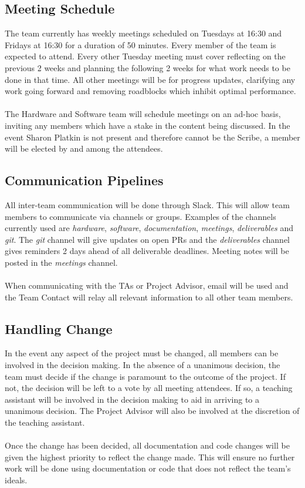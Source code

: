 \documentclass[11pt]{article}
\begin{document}
\subsection{Meeting Schedule}
The team currently has weekly meetings scheduled on Tuesdays at 16:30 and Fridays at 16:30 for a duration of 50 minutes. Every member of the team is expected to attend. Every other Tuesday meeting must cover reflecting on the previous 2 weeks and planning the following 2 weeks for what work needs to be done in that time. All other meetings will be for progress updates, clarifying any work going forward and removing roadblocks which inhibit optimal performance. \\ \\
The Hardware and Software team will schedule meetings on an ad-hoc basis, inviting any members which have a stake in the content being discussed. In the event Sharon Platkin is not present and therefore cannot be the Scribe, a member will be elected by and among the attendees.
\subsection{Communication Pipelines}
All inter-team communication will be done through Slack. This will allow team members to communicate via channels or groups. Examples of the channels currently used are \textit{hardware}, \textit{software}, \textit{documentation}, \textit{meetings}, \textit{deliverables} and \textit{git}. The \textit{git} channel will give updates on open PRs and the \textit{deliverables} channel gives reminders 2 days ahead of all deliverable deadlines. Meeting notes will be posted in the \textit{meetings} channel. \\ \\
When communicating with the TAs or Project Advisor, email will be used and the Team Contact will relay all relevant information to all other team members.
\subsection{Handling Change}
In the event any aspect of the project must be changed, all members can be involved in the decision making. In the absence of a unanimous decision, the team must decide if the change is paramount to the outcome of the project. If not, the decision will be left to a vote by all meeting attendees. If so, a teaching assistant will be involved in the decision making to aid in arriving to a unanimous decision. The Project Advisor will also be involved at the discretion of the teaching assistant. \\ \\
Once the change has been decided, all documentation and code changes will be given the highest priority to reflect the change made. This will ensure no further work will be done using documentation or code that does not reflect the team's ideals.
\end{document}
